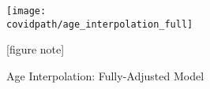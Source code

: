 \documentclass[10pt,letterpaper]{article}
\numberwithin{equation}{section}
\begin{document}
   \clearpage
  \begin{figure}[H]
    \begin{center}
    \caption{Age Interpolation: Fully-Adjusted Model}
    
    \texttt{[image: \\covidpath/age\_interpolation\_full]}
    
    \footnotesize{[figure note]}
    \end{center}
  \end{figure}



\end{document}
